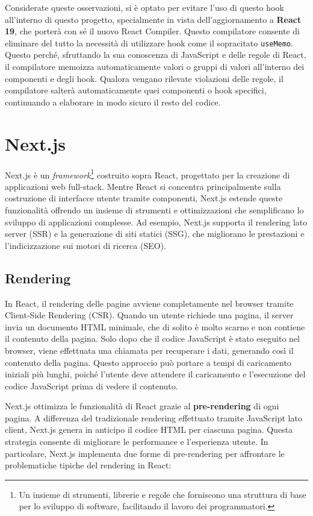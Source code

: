 \documentclass[target=bach,aauheader=,style=]{thud}
\begin{document}
\noindent Considerate queste osservazioni, si è optato per evitare l'uso di questo hook all'interno di questo progetto, specialmente in vista dell'aggiornamento a \textbf{React 19}, che porterà con sé il nuovo React Compiler. Questo compilatore consente di eliminare del tutto la necessità di utilizzare hook come il sopracitato \texttt{useMemo}. Questo perché, sfruttando la sua conoscenza di JavaScript e delle regole di React, il compilatore memoizza automaticamente valori o gruppi di valori all'interno dei componenti e degli hook. Qualora vengano rilevate violazioni delle regole, il compilatore salterà automaticamente quei componenti o hook specifici, continuando a elaborare in modo sicuro il resto del codice.

\section{Next.js}
Next.js \cite{nextjsdocs2024} è un \textit{framework}\footnote{Un insieme di strumenti, librerie e regole che forniscono una struttura di base per lo sviluppo di software, facilitando il lavoro dei programmatori.} costruito sopra React, progettato per la creazione di applicazioni web full-stack. Mentre React si concentra principalmente sulla costruzione di interfacce utente tramite componenti, Next.js estende queste funzionalità offrendo un insieme di strumenti e ottimizzazioni che semplificano lo sviluppo di applicazioni complesse. Ad esempio, Next.js supporta il rendering lato server (SSR) e la generazione di siti statici (SSG), che migliorano le prestazioni e l'indicizzazione sui motori di ricerca (SEO).

\subsection{Rendering}
In React, il rendering delle pagine avviene completamente nel browser tramite Client-Side Rendering (CSR). Quando un utente richiede una pagina, il server invia un documento HTML minimale, che di solito è molto scarno e non contiene il contenuto della pagina. Solo dopo che il codice JavaScript è stato eseguito nel browser, viene effettuata una chiamata per recuperare i dati, generando così il contenuto della pagina. Questo approccio può portare a tempi di caricamento iniziali più lunghi, poiché l'utente deve attendere il caricamento e l'esecuzione del codice JavaScript prima di vedere il contenuto.

\noindent Next.js ottimizza le funzionalità di React grazie al \textbf{pre-rendering} di ogni pagina. A differenza del tradizionale rendering effettuato tramite JavaScript lato client, Next.js genera in anticipo il codice HTML per ciascuna pagina. Questa strategia consente di migliorare le performance e l'esperienza utente. In particolare, Next.js implementa due forme di pre-rendering per affrontare le problematiche tipiche del rendering in React:
\end{document}
